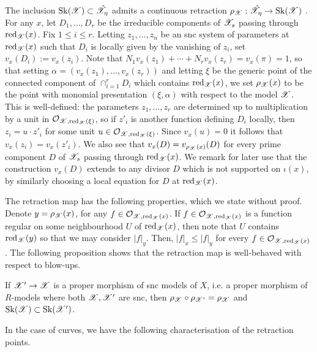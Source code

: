 The inclusion $\operatorname{Sk}(\mathscr{X}) \subset \hat{\mathscr{X}}_{\eta}$ admits a continuous retraction $\rho_{\mathscr{X}} : \hat{\mathscr{X}}_{\eta} \to \operatorname{Sk}(\mathscr{X})$ \parencite[\S 3.1.5]{MN}. 
For any $x$, let $D_1, \dots, D_r$ be the irreducible components of $\mathscr{X}_s$ passing through $\operatorname{red}_{\mathscr{X}}(x)$. 
Fix $1 \leq i \leq r$.
Letting $z_1, \dots, z_n$ be an snc system of parameters at $\operatorname{red}_{\mathscr{X}}(x)$ such that $D_i$ is locally given by the vanishing of $z_i$, set $v_x(D_i) := v_x(z_i)$.
Note that $N_1v_x(z_1) + \cdots + N_r v_x(z_r) = v_x(\pi) = 1$, so that setting $\alpha = (v_x(z_1), \dots, v_x(z_r))$ and letting $\xi$ be the generic point of the connected component of $\cap_{i = 1}^r D_i$ which contains $\operatorname{red}_{\mathscr{X}}(x)$, we set $\rho_{\mathscr{X}}(x)$ to be the point with monomial presentation $(\xi, \alpha)$ with respect to the model $\mathscr{X}$.
This is well-defined: the parameters $z_1, \dots, z_r$ are determined up to multiplication by a unit in $\mathcal{O}_{\mathscr{X}, \operatorname{red}_{\mathscr{X}}(\xi)}$, so if $z'_i$ is another function defining $D_i$ locally, then $z_i = u \cdot z'_i$ for some unit $u \in \mathcal{O}_{\mathscr{X}, \operatorname{red}_{\mathscr{X}}(\xi)}$.
Since $v_x(u) = 0$ it follows that $v_x(z_i) = v_x(z'_i)$.
We also see that $v_x(D) = v_{\rho_{\mathscr{X}}(x)}(D)$ for every prime component $D$ of $\mathscr{X}_s$ passing through $\operatorname{red}_{\mathscr{X}}(x)$.
We remark for later use that the construction $v_x(D)$ extends to any divisor $D$ which is not supported on $\iota(x)$, by similarly choosing a local equation for $D$ at $\operatorname{red}_{\mathscr{X}}(x)$.

The retraction map has the following properties, which we state without proof. 
Denote $y = \rho_{\mathscr{X}}(x)$, for any $f \in \mathcal{O}_{\mathscr{X}, \operatorname{red}_{\mathscr{X}}(x)}$. 
If $f \in \mathcal{O}_{\mathscr{X}, \operatorname{red}_{\mathscr{X}}(x)}$ is a function regular on some neighbourhood $U$ of $\operatorname{red}_{\mathscr{X}}(x)$, then note that $U$ contains $\operatorname{red}_{\mathscr{X}}(y)$ so that we may consider $|f|_y$. 
Then, $|f|_x \leq |f|_y$ for every $f \in \mathcal{O}_{\mathscr{X}, \operatorname{red}_{\mathscr{X}}(x)}$ \parencite[Prop. 3.1.6]{MN}. 
The following proposition shows that the retraction map is well-behaved with respect to blow-ups.

\begin{prop} \label{retractionsinversesystem} \parencite[Prop. 3.1.7]{MN}
    If $\mathscr{X}' \to \mathscr{X}$ is a proper morphism of snc models of $X$, i.e. a proper morphism of $R$-models where both $\mathscr{X}, \mathscr{X}'$ are snc, then $\rho_{\mathscr{X}} \circ \rho_{\mathscr{X}'} = \rho_{\mathscr{X}}$ and $\operatorname{Sk}(\mathscr{X}) \subset \operatorname{Sk}(\mathscr{X}')$.
\end{prop}

In the case of curves, we have the following characterisation of the retraction points.

